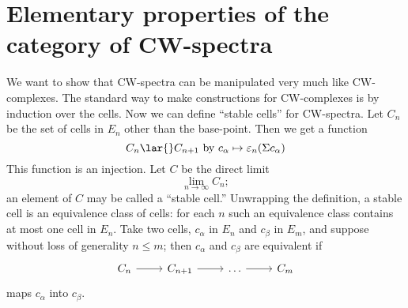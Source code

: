 \documentclass[../main]{subfiles}
\begin{document}
\label{sec:p3ch03}
\chapter{Elementary properties of the category of CW-spectra}


    
We want to show that CW-spectra can be manipulated very much
like CW-complexes. The standard way to make constructions for
CW-complexes is by induction over the cells. Now we can define ``stable
cells''  for CW-spectra. Let $C_n$ be the set of cells in $E_n$ other than
the base-point. Then we get a function 
\[C_n \lar{}C_{n+1} \text{ by } c_\alpha \mapsto \varepsilon_n(\Sigma c_\alpha)\]
This function is an injection. Let $C$ be the direct limit \[\lim_{n\to\infty} C_n;\]
an element of $C$ may be called a ``stable cell.'' Unwrapping the definition, a stable cell is an equivalence class of cells: for each $n$ such
an equivalence class contains at most one cell in $E_n$. Take two cells,
$c_\alpha$ in $E_n$ and $c_\beta$ in $E_m$, and suppose without loss of generality $n\leq m$; then $c_\alpha$ and $c_\beta$ are equivalent if 
\[
\begin{tikzcd}
C_n \arrow[r] & C_{n+1} \arrow[r] & \dots \arrow[r] & C_m
\end{tikzcd}\]
maps $c_\alpha$ into $c_\beta$.
\end{document}
